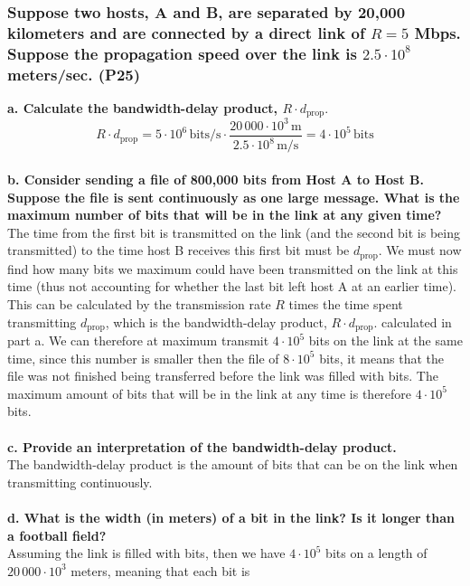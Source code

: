 \subsubsection{Suppose two hosts, A and B, are separated by 20,000 kilometers and are connected by a direct link of $R = 5$ Mbps. Suppose the propagation speed over the link is $2.5 \cdot 10^8$ meters/sec. (P25)}

\textbf{a. Calculate the bandwidth-delay product, $R \cdot d_\text{prop}.$} \\
\begin{equation*}
    R \cdot d_\text{prop} = 5 \cdot 10^6 \, \text{bits/s} \cdot \frac{20 \, 000 \cdot 10^3 \, \text{m}}{2.5 \cdot 10^8 \, \text{m/s}} = 4 \cdot 10^5 \, \text{bits}
\end{equation*}
\\
\textbf{b. Consider sending a file of 800,000 bits from Host A to Host B. Suppose the file is sent continuously as one large message. What is the maximum number of bits that will be in the link at any given time?} \\
The time from the first bit is transmitted on the link (and the second bit is being transmitted) to the time host B receives this first bit must be $d_\text{prop}$. We must now find how many bits we maximum could have been transmitted on the link at this time (thus not accounting for whether the last bit left host A at an earlier time). This can be calculated by the transmission rate $R$ times the time spent transmitting $d_\text{prop}$, which is the bandwidth-delay product, $R \cdot d_\text{prop}.$ calculated in part a. We can therefore at maximum transmit $4 \cdot 10^5$ bits on the link at the same time, since this number is smaller then the file of $8 \cdot 10^5$ bits, it means that the file was not finished being transferred before the link was filled with bits. The maximum amount of bits that will be in the link at any time is therefore $4 \cdot 10^5$ bits. \\
\\
\textbf{c. Provide an interpretation of the bandwidth-delay product.} \\
The bandwidth-delay product is the amount of bits that can be on the link when transmitting continuously. \\
\\
\textbf{d. What is the width (in meters) of a bit in the link? Is it longer than a football field?} \\
Assuming the link is filled with bits, then we have $4 \cdot 10^5$ bits on a length of $20 \, 000 \cdot 10^3$ meters, meaning that each bit is
